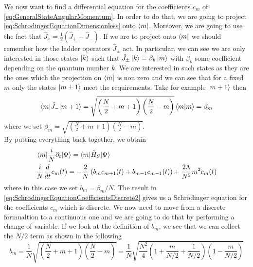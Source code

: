 We now want to find a differential equation for the coefficients $ c_{m} $ of \cref{eq:GeneralStateAngularMomentum}.
In order to do that, we are going to project \cref{eq:SchrodingerEquationDimensionless} onto $ \bra{m} $.
Moreover, we are going to use the fact that $ \hat{J}_x = \frac{1}{2}\left(\hat{J}_{+} + \hat{J}_{-}\right) $.
If we are to project onto $ \bra{m} $ we should remember how the ladder operators $ \hat{J}_{\pm} $ act.
In particular, we can see we are only interested in those states $ \ket{k} $ such that $ \hat{J}_{\pm}\ket{k} = \beta_{k} \ket{m} $ with $ \beta_{k} $ some coefficient depending on the quantum number $ k $.
We are interested in such states as they are the ones which the projection on $ \bra{m} $ is non zero and we can see that for a fixed $ m $   only the states $ \ket{m \pm 1} $ meet the requirements.
Take for example $ \ket{m +1} $ then
\begin{equation}
\label{eq:LadderOperatorsProjected}
\braket{m|\hat{J}_{-} |m + 1 } = \sqrt{
	\left(\frac{N}{2} + m +1\right)
	\left(\frac{N}{2} -m\right)
} 
	\braket{m|m}
	= 
	\beta_{m}
\end{equation}
where we set $ \beta_{m} =\sqrt {    \left(\frac{N}{2} + m +1\right)  \left(\frac{N}{2} -m\right) }$.\\
By putting everything back together, we obtain
\begin{align}
	&	\braket{m|\frac{i}{N}\partial_t|\Psi} = \braket{m|\tilde{H}_{S}|\Psi}\label{eq:SchrodingerEquationCoefficientsDiscrete1}\\
	& 	\frac{i}{N}\frac{d}{dt}c_{m}(t) =  -\frac{2}{N}\left( b_{m}c_{m+1}(t) + b_{m-1}c_{m-1}(t) \right) + \frac{2\Lambda}{N^2}m^2c_{m}(t)\label{eq:SchrodingerEquationCoefficientsDiscrete2}
\end{align}
where in this case we set $ b_{m} = \beta_m/N $. 
The result in \cref{eq:SchrodingerEquationCoefficientsDiscrete2} gives us a Schr{\"o}dinger equation for the coefficients $ c_{m} $ which is discrete. We now need to move from a discrete formualtion to a continuous one and we are going to do that by performing a change of variable.
If we look at the definition of $ b_{m} $, we see that we can collect the $ N/2 $ term as shown in the following
\begin{equation}
\label{eq:CoefficientCollectingN}
 b_m =\frac{1}{N}\sqrt{
 		\left(\frac{N}{2} + m +1\right)  \left(\frac{N}{2} -m\right) 
	}  =
 	\frac{1}{N}\sqrt{
		\frac{N^2}{4}    
		\left(1 + \frac{m}{N/2} +\frac{1}{N/2}\right)
		\left(1 -\frac{m}{N/2}\right) 
	}
\end{equation}
